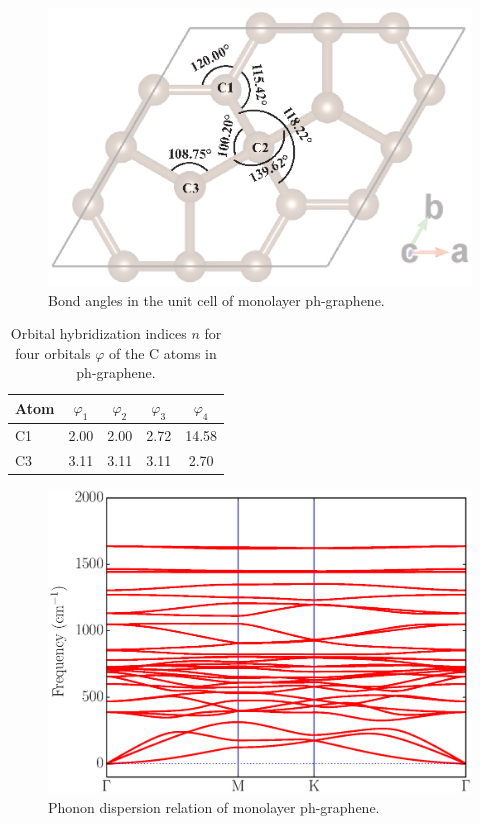 \begin{figure}[htb]
\centering
\includegraphics[width=0.7\linewidth]{PG_bond-angle.eps}%
\caption{  Bond angles in the unit cell of monolayer ph-graphene. \label{angle}}
\end{figure}
  
\begin{table}[htb]
\centering
\caption{Orbital hybridization indices $n$ for four orbitals $\varphi$ of the C atoms in ph-graphene. \label{hybrid}}
\begin{tabular}{lcccc}
\hline\hline
Atom & $\varphi_1$ & $\varphi_2$ & $\varphi_3$ & $\varphi_4$  \\ \hline
C1 & 2.00 & 2.00 & 2.72 & 14.58 \\
C3 & 3.11 & 3.11 & 3.11 & 2.70 \\
\hline\hline
\end{tabular}
\end{table}

\begin{figure}[htb]
\centering
\includegraphics[width=0.7\linewidth]{PG_phonon.eps}%
\caption{  Phonon dispersion relation of monolayer ph-graphene. \label{phonon}}
\end{figure}


